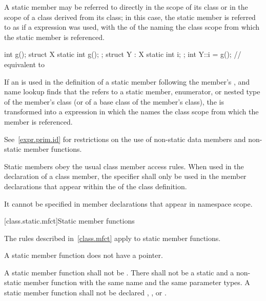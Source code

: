 \pnum
A static member may be referred to directly in the scope of its
class or in the scope of a class derived
from its class; in this case, the static member is referred to
as if a  expression was used, with the
 of the  naming
the class scope from which the static member is referenced.
\begin{example}
\begin{codeblock}
int g();
struct X {
  static int g();
};
struct Y : X {
  static int i;
};
int Y::i = g();                 // equivalent to 
\end{codeblock}
\end{example}

\pnum
If an  is used in the
definition of a static member following the member's
, and name lookup
finds that the  refers to a static
member, enumerator, or nested type of the member's class (or of a base
class of the member's class), the  is
transformed into a  expression in which the
 names the class scope from which the
member is referenced.
\begin{note}
See~\ref{expr.prim.id} for restrictions on the use of non-static data
members and non-static member functions.
\end{note}


\pnum
Static members obey the usual class member access rules.
When used in the declaration of a class
member, the  specifier shall only be used in the member
declarations that appear within the  of
the class definition.
\begin{note}
It cannot be specified in member declarations that appear in namespace scope.
\end{note}

[class.static.mfct]{Static member functions}
%

\pnum
\begin{note}
The rules described in~\ref{class.mfct} apply to static member
functions.
\end{note}

\pnum
\begin{note}
A static member function does not have a 
pointer.
\end{note}
A static member function shall not be . There
shall not be a static and a non-static member function with the
same name and the same parameter types. A
static member function shall not be declared ,
, or .

